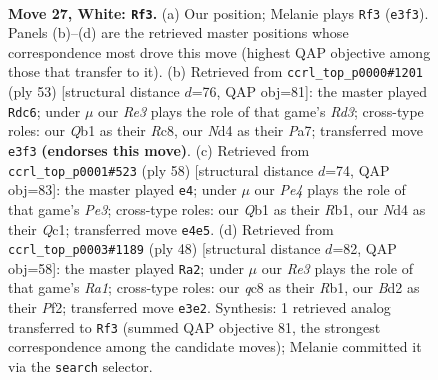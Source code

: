 \documentclass[11pt]{article}
\begin{document}
\clearpage

\begin{figure}[p]\centering
\begin{subfigure}{0.46\textwidth}\centering
\resizebox{\linewidth}{!}{%
\newchessgame
\chessboard[
  setfen={1rq2b2/n1p1rk2/p2p1pp1/3P3p/RP1NP3/4R2P/3B1PP1/1Q4K1 w - - 3 27},
  showmover=false,
  pgfstyle=straightmove, color=movearrow, markmove={e3-f3}
]}
\caption{}
\end{subfigure}\hfill
\begin{subfigure}{0.46\textwidth}\centering
\resizebox{\linewidth}{!}{%
\newchessgame
\chessboard[
  setfen={2r3k1/p4p2/3rq2p/2pp2p1/1n6/1P2PP2/PQ1R1BPP/2R3K1 b - - 3 27},
  showmover=false,
  pgfstyle=straightmove, color=movearrow, markmove={d6-c6}
]}
\caption{}
\end{subfigure}
\\[4pt]
\begin{subfigure}{0.46\textwidth}\centering
\resizebox{\linewidth}{!}{%
\newchessgame
\chessboard[
  setfen={1rb1r1k1/1q3pnp/p2p2p1/2pP4/8/R3P1PP/1PN2PB1/1RQ3K1 w - - 1 30},
  showmover=false,
  pgfstyle=straightmove, color=movearrow, markmove={e3-e4}
]}
\caption{}
\end{subfigure}\hfill
\begin{subfigure}{0.46\textwidth}\centering
\resizebox{\linewidth}{!}{%
\newchessgame
\chessboard[
  setfen={r1r5/1p1q1pk1/3p2p1/b2P3p/P1Pp3P/3B2P1/2Q2PK1/RR6 w - - 0 25},
  showmover=false,
  pgfstyle=straightmove, color=movearrow, markmove={a1-a2}
]}
\caption{}
\end{subfigure}
\caption{\textbf{Move 27, White: \texttt{Rf3}.} (a) Our position; Melanie plays \texttt{Rf3} (\texttt{e3f3}). Panels (b)--(d) are the retrieved master positions whose correspondence most drove this move (highest QAP objective among those that transfer to it). (b) Retrieved from \texttt{ccrl\_top\_p0000\#1201} (ply 53) [structural distance $d$=76, QAP obj=81]: the master played \texttt{Rdc6}; under $\mu$ our \emph{Re3} plays the role of that game's \emph{Rd3}; cross-type roles: our \emph{Q}b1 as their \emph{R}c8, our \emph{N}d4 as their \emph{P}a7; transferred move \texttt{e3f3} \textbf{(endorses this move)}. (c) Retrieved from \texttt{ccrl\_top\_p0001\#523} (ply 58) [structural distance $d$=74, QAP obj=83]: the master played \texttt{e4}; under $\mu$ our \emph{Pe4} plays the role of that game's \emph{Pe3}; cross-type roles: our \emph{Q}b1 as their \emph{R}b1, our \emph{N}d4 as their \emph{Q}c1; transferred move \texttt{e4e5}. (d) Retrieved from \texttt{ccrl\_top\_p0003\#1189} (ply 48) [structural distance $d$=82, QAP obj=58]: the master played \texttt{Ra2}; under $\mu$ our \emph{Re3} plays the role of that game's \emph{Ra1}; cross-type roles: our \emph{q}c8 as their \emph{R}b1, our \emph{B}d2 as their \emph{P}f2; transferred move \texttt{e3e2}. Synthesis: 1 retrieved analog transferred to \texttt{Rf3} (summed QAP objective 81, the strongest correspondence among the candidate moves); Melanie committed it via the \texttt{search} selector.}
\label{fig:thought-m52}
\end{figure}
\end{document}
